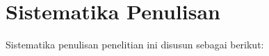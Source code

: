 




\section{Sistematika Penulisan}
\label{sec:sistematikaPenulisan}
Sistematika penulisan penelitian ini disusun sebagai berikut:

